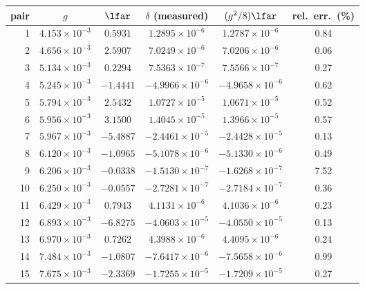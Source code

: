 \begin{tabular}{@{}rccccc@{}}
\toprule
pair & $g$ & $\lfar$ & $\delta$ (measured) & $(g^{2}/8)\lfar$ & rel.\ err.\ (\%)\\
\midrule
1 & $4.153\times10^{-3}$ & $0.5931$ & $1.2895\times10^{-6}$ & $1.2787\times10^{-6}$ & 0.84\\
2 & $4.656\times10^{-3}$ & $2.5907$ & $7.0249\times10^{-6}$ & $7.0206\times10^{-6}$ & 0.06\\
3 & $5.134\times10^{-3}$ & $0.2294$ & $7.5363\times10^{-7}$ & $7.5566\times10^{-7}$ & 0.27\\
4 & $5.245\times10^{-3}$ & $-1.4441$ & $-4.9966\times10^{-6}$ & $-4.9658\times10^{-6}$ & 0.62\\
5 & $5.794\times10^{-3}$ & $2.5432$ & $1.0727\times10^{-5}$ & $1.0671\times10^{-5}$ & 0.52\\
6 & $5.956\times10^{-3}$ & $3.1500$ & $1.4045\times10^{-5}$ & $1.3966\times10^{-5}$ & 0.57\\
7 & $5.967\times10^{-3}$ & $-5.4887$ & $-2.4461\times10^{-5}$ & $-2.4428\times10^{-5}$ & 0.13\\
8 & $6.120\times10^{-3}$ & $-1.0965$ & $-5.1078\times10^{-6}$ & $-5.1330\times10^{-6}$ & 0.49\\
9 & $6.206\times10^{-3}$ & $-0.0338$ & $-1.5130\times10^{-7}$ & $-1.6268\times10^{-7}$ & 7.52\\
10 & $6.250\times10^{-3}$ & $-0.0557$ & $-2.7281\times10^{-7}$ & $-2.7184\times10^{-7}$ & 0.36\\
11 & $6.429\times10^{-3}$ & $0.7943$ & $4.1131\times10^{-6}$ & $4.1036\times10^{-6}$ & 0.23\\
12 & $6.893\times10^{-3}$ & $-6.8275$ & $-4.0603\times10^{-5}$ & $-4.0550\times10^{-5}$ & 0.13\\
13 & $6.970\times10^{-3}$ & $0.7262$ & $4.3988\times10^{-6}$ & $4.4095\times10^{-6}$ & 0.24\\
14 & $7.484\times10^{-3}$ & $-1.0807$ & $-7.6417\times10^{-6}$ & $-7.5658\times10^{-6}$ & 0.99\\
15 & $7.675\times10^{-3}$ & $-2.3369$ & $-1.7255\times10^{-5}$ & $-1.7209\times10^{-5}$ & 0.27\\
\bottomrule
\end{tabular}
